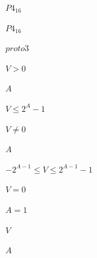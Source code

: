 \documentclass[10pt]{book}
\begin{document}
\begin{mdSnippets}
\begin{mdInlineSnippet}%
$P4_{16}$\end{mdInlineSnippet}%
\begin{mdInlineSnippet}%
$P4_{16}$\end{mdInlineSnippet}%
\begin{mdInlineSnippet}[2002bba10a26e42e7324f3842669c712]%
$proto3$\end{mdInlineSnippet}%
\begin{mdInlineSnippet}%
$V > 0$\end{mdInlineSnippet}%
\begin{mdInlineSnippet}[7fc56270e7a70fa81a5935b72eacbe29]%
$A$\end{mdInlineSnippet}%
\begin{mdInlineSnippet}%
$V \leq 2^A -1$\end{mdInlineSnippet}%
\begin{mdInlineSnippet}[8f21874330b0b0d2f91e831f2f0e7f6a]%
$V \neq 0$\end{mdInlineSnippet}%
\begin{mdInlineSnippet}[7fc56270e7a70fa81a5935b72eacbe29]%
$A$\end{mdInlineSnippet}%
\begin{mdInlineSnippet}[323b77d22bf5c16cfde8f2ac3446a479]%
$-2^{A-1} \leq V \leq 2^{A-1} - 1$\end{mdInlineSnippet}%
\begin{mdInlineSnippet}[67d25a48b1450fb4f887f3329a504ab8]%
$V=0$\end{mdInlineSnippet}%
\begin{mdInlineSnippet}[a5a2929bc80363d4ffe77ca4cf1911b8]%
$A=1$\end{mdInlineSnippet}%
\begin{mdInlineSnippet}[5206560a306a2e085a437fd258eb57ce]%
$V$\end{mdInlineSnippet}%
\begin{mdInlineSnippet}[7fc56270e7a70fa81a5935b72eacbe29]%
$A$\end{mdInlineSnippet}%

\end{mdSnippets}
\end{document}
